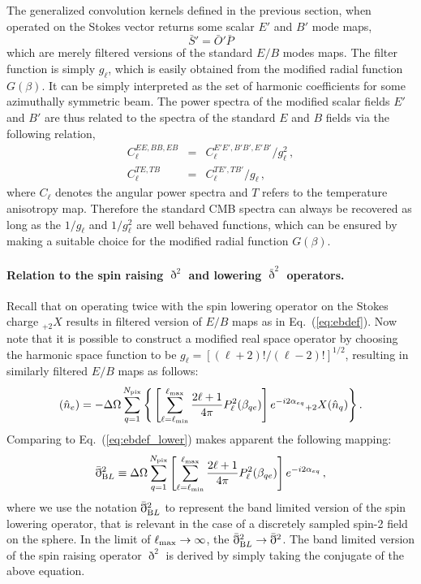 \documentclass[a4paper,11pt]{article}
\newcommand{\beq}{\begin{equation}}
\newcommand{\eeq}{\end{equation}}
\newcommand{\beqry}{\begin{eqnarray}}
\newcommand{\eeqry}{\end{eqnarray}}
\def\eq#1{{Eq.~(\ref{#1})}}
\begin{document}
The generalized convolution kernels defined in the previous section, when operated on the Stokes vector returns some scalar $E'$ and $B'$ mode maps,
%
\beq
\bar{S}' = \bar{O}' \bar{P}
\eeq
%
which are merely filtered versions of the standard $E/B$ modes maps. The filter function is simply $g_{\ell}$, which is easily obtained from the modified radial function $G(\beta)$.  It can be simply interpreted as the set of harmonic coefficients for some azimuthally symmetric beam. The power spectra of the modified scalar fields $E'$ and $B'$ are thus related to the spectra of the standard $E$ and $B$ fields via the following relation, 
 \begin{subequations}
 \beqry
C_{\ell}^{EE,BB,EB} &= &C_{\ell}^{E'E',B'B',E'B'} /   g_{\ell}^2\,,\\
C_{\ell}^{TE,TB}  &=&  C_{\ell}^{TE',TB'} / g_{\ell}\,,
 \eeqry
 \end{subequations}
 where $C_{\ell}$ denotes the angular power spectra and $T$ refers to the temperature anisotropy map. Therefore the standard CMB spectra can always be recovered as long as the $1/g_{\ell}$ and $1/g_{\ell}^2$ are well behaved functions, which can be ensured by making a suitable choice for the modified radial function $G(\beta)$. 

\paragraph{Relation to the spin raising $\eth^2$ and lowering $\bar{\eth}^2$ operators.}
Recall that on operating twice with the spin lowering operator on the Stokes charge ${}_{+2}X$ results in filtered version of $E/B$ maps as in \eq{eq:ebdef}. Now note that it is possible to construct a modified real space operator by choosing the harmonic space function to be $g_{\ell} = [{(\ell+2)!/(\ell-2)!}]^{1/2}$, resulting in similarly filtered $E/B$ maps as follows:
%
\beq 
[\mathcal{E} + i \mathcal{B}](\hat{n}_e)=- \Delta \Omega\sum_{q=1}^{N_{\rm pix}} \Bigg\lbrace  \left[  \sum_{\ell=\ell_{\rm min}}^{\ell_{\rm max}} \frac{2 \ell+1}{4 \pi} P_{\ell}^2(\beta_{qe}) \right] e^{-i2\alpha_{eq}} {}_{+2}X(\hat{n}_{q}) \Bigg\rbrace \,. \label{eq:bl_ebdef_lower} 
\eeq
%
Comparing to \eq{eq:ebdef_lower} makes apparent the following mapping:
%
\beq
\bar{\eth}^2_{\textrm BL} \equiv \Delta \Omega \sum_{q=1}^{N_{\rm pix}} \left[ \sum_{\ell=\ell_{\rm min}}^{\ell_{\rm max}} \frac{2 \ell+1}{4 \pi} P_{\ell}^2(\beta_{qe}) \right] e^{-i2\alpha_{eq}}\,,
\eeq
%
where we use the notation $\bar{\eth}^2_{\textrm BL}$ to represent the band limited version of the spin lowering operator, that is relevant in the case of a discretely sampled spin-2 field on the sphere. In the limit of $\ell_{\rm max} \rightarrow \infty$, the $\bar{\eth}^2_{\textrm BL} \rightarrow \bar{\eth}^2$.
The band limited version of the spin raising operator $\eth^2$ is derived by simply taking the conjugate of the above equation.
%
\end{document}
